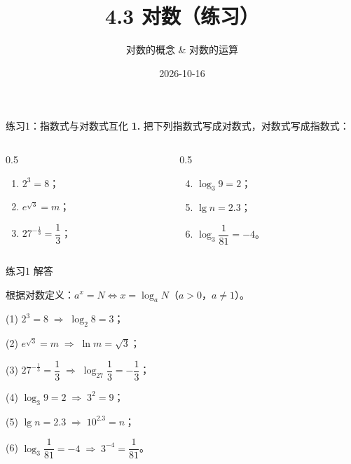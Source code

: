 \documentclass[10pt,aspectratio=169,serif]{beamer}
\title[对数练习]{4.3 对数（练习）}
\subtitle{对数的概念 \& 对数的运算}
\author{}
\institute{}
\date{2026-10-16}
\begin{document}
\begin{frame}
  \titlepage
\end{frame}

\begin{frame}[t]{练习1：指数式与对数式互化}
\textbf{1.} 把下列指数式写成对数式，对数式写成指数式：

\vspace{0.5em}
\begin{columns}[t]
\begin{column}{0.5\textwidth}
\begin{enumerate}
  \item $2^3 = 8$；
  \item $e^{\sqrt{3}} = m$；
  \item $27^{-\frac{1}{3}} = \dfrac{1}{3}$；
\end{enumerate}
\end{column}
\begin{column}{0.5\textwidth}
\begin{enumerate}\setcounter{enumi}{3}
  \item $\log_3 9 = 2$；
  \item $\lg n = 2.3$；
  \item $\log_3 \dfrac{1}{81} = -4$。
\end{enumerate}
\end{column}
\end{columns}
\end{frame}

\begin{frame}[t]{练习1 解答}
\begin{tcolorbox}[colback=orange!10,colframe=orange,title=\textbf{解}]
根据对数定义：$a^x = N \iff x = \log_a N$（$a>0$，$a\neq 1$）。

\vspace{0.3em}
(1) $2^3 = 8 \;\Longrightarrow\; \log_2 8 = 3$；

(2) $e^{\sqrt{3}} = m \;\Longrightarrow\; \ln m = \sqrt{3}$；

(3) $27^{-\frac{1}{3}} = \dfrac{1}{3} \;\Longrightarrow\; \log_{27}\dfrac{1}{3} = -\dfrac{1}{3}$；

(4) $\log_3 9 = 2 \;\Longrightarrow\; 3^2 = 9$；

(5) $\lg n = 2.3 \;\Longrightarrow\; 10^{2.3} = n$；

(6) $\log_3\dfrac{1}{81} = -4 \;\Longrightarrow\; 3^{-4} = \dfrac{1}{81}$。
\end{tcolorbox}
\end{frame}
\end{document}
